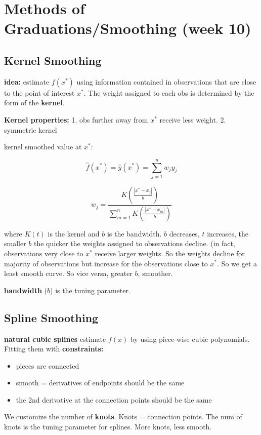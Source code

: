 \documentclass[a4paper]{article}
\begin{document}
\section{Methods of Graduations/Smoothing (week 10)}

\subsection{Kernel Smoothing}

\textbf{idea:} estimate $f(x^*)$ using information contained in observations that are close to the point of interest $x^*$. The weight assigned to each obs is determined by the form of the \textbf{kernel}. 

\textbf{Kernel properties:} 1. obs further away from $x^*$ receive less weight. 2. symmetric kernel

kernel smoothed value at $x^*$:

$$\hat{f}(x^*)=\hat{y}(x^*)=\sum^n_{j=1}w_jy_j$$

$$w_j=\frac{K\left(\frac{|x^*-x_j|}{b}\right)}{\sum^n_{m=1}K\left(\frac{|x^*-x_m|}{b}\right)}$$

where $K(t)$ is the kernel and $b$ is the bandwidth. $b$ decreases, $t$ increases, the smaller $b$ the quicker the weights assigned to observations decline. (in fact, observations very close to $x^*$ receive larger weights. So the weights decline for majority of observations but increase for the observations close to $x^*$. So we get a least smooth curve. So vice versa, greater $b$, smoother.

\textbf{bandwidth} ($b$) is the tuning parameter.

\subsection{Spline Smoothing}

\textbf{natural cubic splines} estimate $f(x)$ by using piece-wise cubic polynomials. Fitting them with \textbf{constraints:}

\begin{itemize}
	\item pieces are connected
	\item smooth = derivatives of endpoints should be the same
	\item the 2nd derivative at the connection points should be the same
\end{itemize}

We customize the number of \textbf{knots}. Knots = connection points. The num of knots is the tuning parameter for splines. More knots, less smooth.
\end{document}
